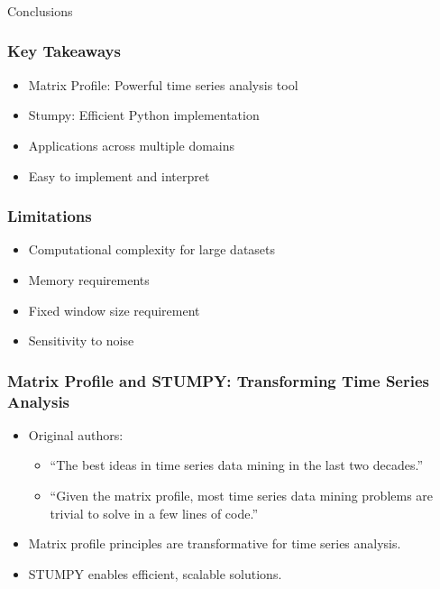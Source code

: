 \begin{frame}[fragile]\frametitle{}
\begin{center}
{\Large Conclusions}
\end{center}
\end{frame}

\begin{frame}[fragile]\frametitle{Key Takeaways}
    \begin{itemize}
        \item Matrix Profile: Powerful time series analysis tool
        \item Stumpy: Efficient Python implementation
        \item Applications across multiple domains
        \item Easy to implement and interpret
    \end{itemize}
\end{frame}

\begin{frame}[fragile]\frametitle{Limitations}
    \begin{itemize}
        \item Computational complexity for large datasets
        \item Memory requirements
        \item Fixed window size requirement
        \item Sensitivity to noise
    \end{itemize}
\end{frame}

\begin{frame}[fragile]\frametitle{Matrix Profile and STUMPY: Transforming Time Series Analysis}
    \begin{itemize}
        \item Original authors: 
            \begin{itemize}
                \item “The best ideas in time series data mining in the last two decades.”
                \item “Given the matrix profile, most time series data mining problems are trivial to solve in a few lines of code.”
            \end{itemize}
        \item Matrix profile principles are transformative for time series analysis.
        \item STUMPY enables efficient, scalable solutions.
    \end{itemize}
\end{frame}



